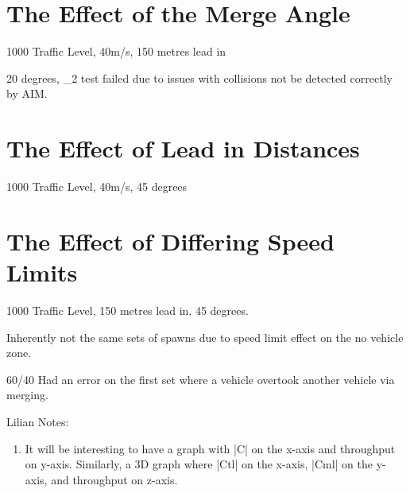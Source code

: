 \section{The Effect of the Merge Angle}
\label{sec:The Effect of the Merge Angle}
1000 Traffic Level, 40m/s, 150 metres lead in

20 degrees, _2 test failed due to issues with collisions not be detected correctly by AIM.

\section{The Effect of Lead in Distances}
\label{sec:The Effect of Lead in Distances}
1000 Traffic Level, 40m/s, 45 degrees

\section{The Effect of Differing Speed Limits}
\label{sec:The Effect of Differing Speed Limits}
1000 Traffic Level, 150 metres lead in, 45 degrees.

Inherently not the same sets of spawns due to speed limit effect on the no vehicle zone.

60/40 Had an error on the first set where a vehicle overtook another vehicle via merging.

Lilian Notes:
\begin{enumerate}
\item It will be interesting to have a graph with |C| on the x-axis and throughput on y-axis. Similarly, a 3D graph where  |Ctl| on the x-axis, |Cml| on the y-axis, and throughput on z-axis.
\end{enumerate}

